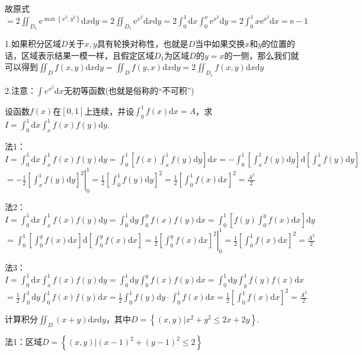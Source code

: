 \begin{xiti}
\begin{solution}
		故原式$=2 \iint_{D_{1}} \mathrm{e}^{\max \left\{x^{2}, y^{2}\right\}} \mathrm{d} x \mathrm{d} y=2 \iint_{D_{1}} \mathrm{e}^{x^{2}} \mathrm{d} x \mathrm{d} y=2 \int_{0}^{1} \mathrm{d} x \int_{0}^{x} \mathrm{e}^{x^{2}} \mathrm{d} y=2 \int_{0}^{1} x \mathrm{e}^{x^{2}} \mathrm{d} x=\mathrm{e}-1$
		
		\begin{note}
			
			1.如果积分区域$D$关于$x,y$具有轮换对称性，也就是$D$当中如果交换$x$和$y$的位置的话，区域表示结果一模一样，且假定区域$D_{1}$为区域$D$的$y=x$的一侧，那么我们就可以得到$\iint_{D} f(x,y) \mathrm{d} x \mathrm{d} y= \iint_{D} f(y,x) \mathrm{d} x \mathrm{d} y = 2\iint_{D_{1}} f(x,y) \mathrm{d} x \mathrm{d} y$
			
			2.注意：$\int e^{x^{2}} \mathrm{d} x$无初等函数(也就是俗称的“不可积”)
		\end{note}
	\end{solution}
	\item 设函数$f(x)$在$[0,1]$上连续，并设$\int_{0}^{1} f(x) \mathrm{d} x=A$，求$I=\int_{0}^{1} \mathrm{d} x \int_{x}^{1} f(x) f(y) \mathrm{d} y$.
	\begin{solution}
		法1：$I=\int_{0}^{1} \mathrm{d} x \int_{x}^{1} f(x) f(y) \mathrm{d} y=\int_{0}^{1}\left[f(x) \int_{x}^{1} f(y) \mathrm{d} y\right] \mathrm{d} x=-\int_{0}^{1}\left[\int_{x}^{1} f(y) \mathrm{d} y\right] \mathrm{d}\left[\int_{x}^{1} f(y) \mathrm{d} y\right]$
		$=-\frac{1}{2}\left.\left[\int_{x}^{1} f(y) \mathrm{d} y\right]^{2}\right|_{0} ^{1}=\frac{1}{2}\left[\int_{0}^{1} f(y) \mathrm{d} y\right]^{2}=\frac{1}{2}\left[\int_{0}^{1} f(x) \mathrm{d} x\right]^{2}=\frac{A^{2}}{2}$
		
		法2：$I=\int_{0}^{1} \mathrm{d} x \int_{x}^{1} f(x) f(y) \mathrm{d} y=\int_{0}^{1} \mathrm{d} y \int_{0}^{y} f(x) f(y) \mathrm{d} x=\int_{0}^{1}\left[f(y) \int_{0}^{y} f(x) \mathrm{d} x\right] \mathrm{d} y$
		$=\int_{0}^{1}\left[\int_{0}^{y} f(x) \mathrm{d} x\right] \mathrm{d}\left[\int_{0}^{y} f(x) \mathrm{d} x\right]=\frac{1}{2}\left.\left[\int_{0}^{y} f(x) \mathrm{d} x\right]^{2}\right|_{0} ^{1}=\frac{1}{2}\left[\int_{0}^{1} f(x) \mathrm{d} x\right]^{2}=\frac{A^{2}}{2}$
		
		法3：$I=\int_{0}^{1} \mathrm{d} x \int_{x}^{1} f(x) f(y) \mathrm{d} y=\int_{0}^{1} \mathrm{d} y \int_{0}^{y} f(x) f(y) \mathrm{d} x=\int_{0}^{1} \mathrm{d} y \int_{y}^{1} f(y) f(x) \mathrm{d} x$
		\\$=\frac{1}{2} \int_{0}^{1} \mathrm{d} y \int_{0}^{1} f(x) f(y) \mathrm{d} x=\frac{1}{2} \int_{0}^{1} f(y) \mathrm{d} y \cdot \int_{0}^{1} f(x) \mathrm{d} x=\frac{1}{2}\left[\int_{0}^{1} f(x) \mathrm{d} x\right]^{2}=\frac{A^{2}}{2}$
	\end{solution}
	\item 计算积分$\iint_{D}(x+y) \mathrm{d} x \mathrm{d}y$，其中$D=\left\{(x, y) | x^{2}+y^{2} \leqslant 2 x+2 y\right\}$.
	\begin{solution}
		法1：区域$D=\left\{(x, y) |(x-1)^{2}+(y-1)^{2} \leq 2\right\}$
		

\end{solution}
\end{xiti}
